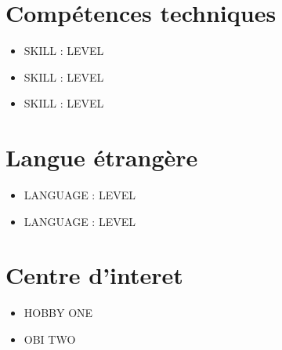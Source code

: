 \documentclass[a4paper,12pt,oneside]{extarticle}
\begin{document}
\section*{Compétences techniques}
\noindent
\begin{flushleft} \begin{itemize}
\item SKILL : LEVEL
\item SKILL : LEVEL
\item SKILL : LEVEL
\end{itemize}
\end{flushleft}


\section*{Langue étrangère}
\noindent
\begin{flushleft} \begin{itemize}
\item LANGUAGE : LEVEL
\item LANGUAGE : LEVEL
\end{itemize}
\end{flushleft}


\section*{Centre d'interet}
\noindent
\begin{itemize}
\item HOBBY ONE 
\item OBI TWO
\end{itemize}


\end{document}

